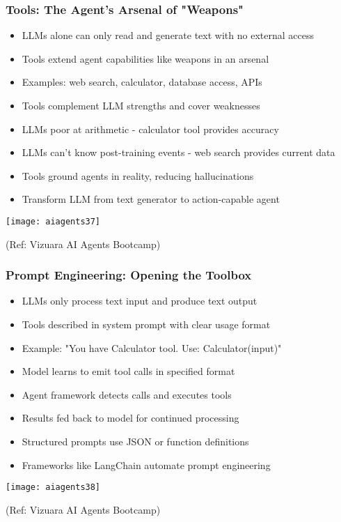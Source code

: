 \begin{frame}[fragile]\frametitle{Tools: The Agent's Arsenal of "Weapons"}
      \begin{itemize}
	  \item LLMs alone can only read and generate text with no external access
	  \item Tools extend agent capabilities like weapons in an arsenal
	  \item Examples: web search, calculator, database access, APIs
	  \item Tools complement LLM strengths and cover weaknesses
	  \item LLMs poor at arithmetic - calculator tool provides accuracy
	  \item LLMs can't know post-training events - web search provides current data
	  \item Tools ground agents in reality, reducing hallucinations
	  \item Transform LLM from text generator to action-capable agent
	  \end{itemize}
	  
		\begin{center}
		\texttt{[image: aiagents37]}

		{\tiny (Ref: Vizuara AI Agents Bootcamp)}

		\end{center}	  	  
\end{frame}

\begin{frame}[fragile]\frametitle{Prompt Engineering: Opening the Toolbox}
      \begin{itemize}
	  \item LLMs only process text input and produce text output
	  \item Tools described in system prompt with clear usage format
	  \item Example: "You have Calculator tool. Use: Calculator(input)"
	  \item Model learns to emit tool calls in specified format
	  \item Agent framework detects calls and executes tools
	  \item Results fed back to model for continued processing
	  \item Structured prompts use JSON or function definitions
	  \item Frameworks like LangChain automate prompt engineering
	  \end{itemize}
	  
		\begin{center}
		\texttt{[image: aiagents38]}

		{\tiny (Ref: Vizuara AI Agents Bootcamp)}

		\end{center}		  
\end{frame}

